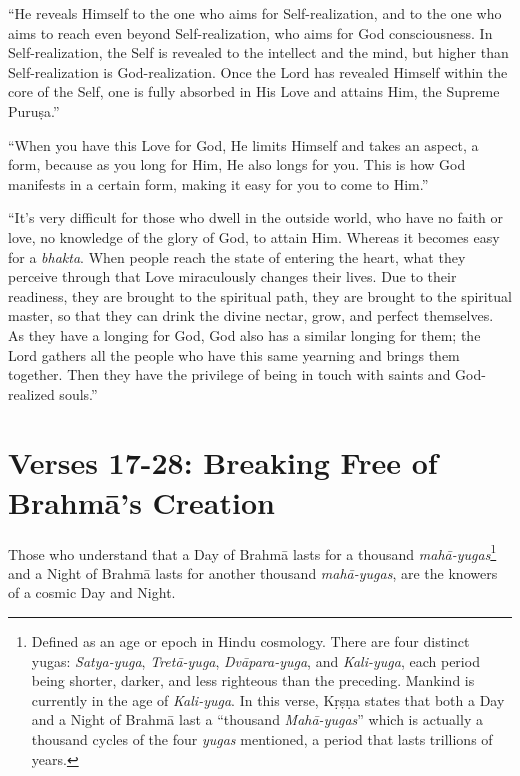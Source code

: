 \enquote{He reveals Himself to the one who aims for Self-realization, and to the one who aims to reach even beyond Self-realization, who aims for God consciousness. In Self-realization, the Self is revealed to the intellect and the mind, but higher than Self-realization is God-realization. Once the Lord has revealed Himself within the core of the Self, one is fully absorbed in His Love and attains Him, the Supreme Puruṣa.}

\enquote{When you have this Love for God, He limits Himself and takes an aspect, a form, because as you long for Him, He also longs for you. This is how God manifests in a certain form, making it easy for you to come to Him.}

\enquote{It’s very difficult for those who dwell in the outside world, who have no faith or love, no knowledge of the glory of God, to attain Him. Whereas it becomes easy for a \textit{bhakta}. When people reach the state of entering the heart, what they perceive through that Love miraculously changes their lives. Due to their readiness, they are brought to the spiritual path, they are brought to the spiritual master, so that they can drink the divine nectar, grow, and perfect themselves. As they have a longing for God, God also has a similar longing for them; the Lord gathers all the people who have this same yearning and brings them together. Then they have the privilege of being in touch with saints and God-realized souls.}

\section{Verses 17-28: Breaking Free of Brahmā's Creation}\label{sec-verses-17-28-breaking-free-of-brahma-s-creation}

{Those who understand that a Day of Brahmā lasts for a thousand \textit{mahā-yugas}\footnote{Defined as an age or epoch in Hindu cosmology. There are four distinct yugas: \textit{Satya-yuga}, \textit{Tretā-yuga}, \textit{Dvāpara-yuga}, and \textit{Kali-yuga}, each period being shorter, darker, and less righteous than the preceding. Mankind is currently in the age of \textit{Kali-yuga}. In this verse, Kṛṣṇa states that both a Day and a Night of Brahmā last a \enquote{thousand \textit{Mahā-yugas}} which is actually a thousand cycles of the four \textit{yugas} mentioned, a period that lasts trillions of years.} and a Night of Brahmā lasts for another thousand \textit{mahā-yugas}, are the knowers of a cosmic Day and Night.}


